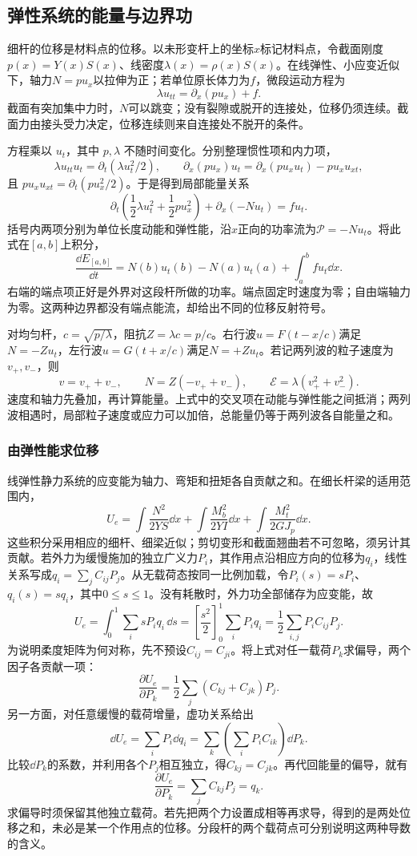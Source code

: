 

\subsection{弹性系统的能量与边界功}
\label{sec:deep7-energy}
细杆的位移是材料点的位移。以未形变杆上的坐标$x$标记材料点，令截面刚度$p(x)=Y(x)S(x)$、线密度$\lambda(x)=\rho(x)S(x)$。在线弹性、小应变近似下，轴力$N=p u_x$以拉伸为正；若单位原长体力为$f$，微段运动方程为
\[
 \lambda u_{tt}=\partial_x(pu_x)+f.
\]
截面有突加集中力时，$N$可以跳变；没有裂隙或脱开的连接处，位移仍须连续。截面力由接头受力决定，位移连续则来自连接处不脱开的条件。

方程乘以 $u_t$，其中 $p,\lambda$ 不随时间变化。分别整理惯性项和内力项，
\[
\lambda u_{tt}u_t=\partial_t(\lambda u_t^2/2),\qquad
\partial_x(pu_x)u_t=\partial_x(pu_xu_t)-pu_xu_{xt},
\]
且 $pu_xu_{xt}=\partial_t(pu_x^2/2)$。于是得到局部能量关系
\[
 \partial_t\left(\frac12\lambda u_t^2+\frac12p u_x^2\right)
 +\partial_x(-Nu_t)=fu_t.
\]
括号内两项分别为单位长度动能和弹性能，沿$x$正向的功率流为$\mathcal P=-Nu_t$。将此式在$[a,b]$上积分，
\[
 \frac{\dd E_{[a,b]}}{\dd t}
 =N(b)u_t(b)-N(a)u_t(a)+\int_a^bfu_t\dd x.
\]
右端的端点项正好是外界对这段杆所做的功率。端点固定时速度为零；自由端轴力为零。这两种边界都没有端点能流，却给出不同的位移反射符号。

对均匀杆，$c=\sqrt{p/\lambda}$，阻抗$Z=\lambda c=p/c$。右行波$u=F(t-x/c)$满足$N=-Zu_t$，左行波$u=G(t+x/c)$满足$N=+Zu_t$。若记两列波的粒子速度为$v_+,v_-$，则
\[
 v=v_++v_-,\qquad N=Z(-v_++v_-),\qquad
 \mathcal E=\lambda(v_+^2+v_-^2).
\]
速度和轴力先叠加，再计算能量。上式中的交叉项在动能与弹性能之间抵消；两列波相遇时，局部粒子速度或应力可以加倍，总能量仍等于两列波各自能量之和。

\subsubsection{由弹性能求位移}
线弹性静力系统的应变能为轴力、弯矩和扭矩各自贡献之和。在细长杆梁的适用范围内，
\[
 U_e=\int\frac{N^2}{2YS}\dd x
 +\int\frac{M_b^2}{2YI}\dd x
 +\int\frac{M_t^2}{2GJ_p}\dd x.
\]
这些积分采用相应的细杆、细梁近似；剪切变形和截面翘曲若不可忽略，须另计其贡献。若外力为缓慢施加的独立广义力$P_i$，其作用点沿相应方向的位移为$q_i$，线性关系写成$q_i=\sum_jC_{ij}P_j$。从无载荷态按同一比例加载，令$P_i(s)=sP_i$、$q_i(s)=sq_i$，其中$0\le s\le1$。没有耗散时，外力功全部储存为应变能，故
\[
 U_e=\int_0^1\sum_i sP_iq_i\,\dd s
 =\left[\frac{s^2}{2}\right]_0^1\sum_iP_iq_i
 =\frac12\sum_{i,j}P_iC_{ij}P_j.
\]
为说明柔度矩阵为何对称，先不预设$C_{ij}=C_{ji}$。将上式对任一载荷$P_k$求偏导，两个因子各贡献一项：
\[
 \frac{\partial U_e}{\partial P_k}
 =\frac12\sum_j(C_{kj}+C_{jk})P_j.
\]
另一方面，对任意缓慢的载荷增量，虚功关系给出
\[
 \dd U_e=\sum_iP_i\dd q_i
 =\sum_k\left(\sum_iP_iC_{ik}\right)\dd P_k.
\]
比较$\dd P_k$的系数，并利用各个$P_j$相互独立，得$C_{kj}=C_{jk}$。再代回能量的偏导，就有
\[
 \frac{\partial U_e}{\partial P_k}=\sum_jC_{kj}P_j=q_k.
\]
求偏导时须保留其他独立载荷。若先把两个力设置成相等再求导，得到的是两处位移之和，未必是某一个作用点的位移。分段杆的两个载荷点可分别说明这两种导数的含义。


